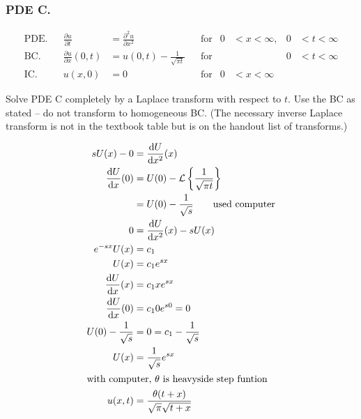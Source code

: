 \documentclass{article}
\begin{document}
\subsubsection*{PDE C.}
\begin{align*}
  \text{PDE.}&&\frac{\partial u}{\partial t}&=\frac{\partial^2u}{\partial x^2}&&\text{for}&0&<x<\infty,&0&<t<\infty\\
  \text{BC.}&&\frac{\partial u}{\partial x}(0,t)&=u(0,t)-\frac{1}{\sqrt{\pi t}}&&\text{for}&&&0&<t<\infty\\
  \text{IC.}&&u(x,0)&=0&&\text{for}&0&<x<\infty
\end{align*}

Solve PDE C completely by a Laplace transform with respect to $t$. Use the BC as stated -- do not transform to homogeneous BC. (The necessary inverse Laplace transform is not in the textbook table but is on the handout list of transforms.)

\begin{align*}
  sU(x)-0&=\frac{\mathrm{d}U}{\mathrm{d}x^2}(x)\\
  \frac{\mathrm{d}U}{\mathrm{d}x}(0)&=U(0)-\mathcal{L}\left\{\frac{1}{\sqrt{\pi t}}\right\}\\
  &=U(0)-\frac{1}{\sqrt{s}}\qquad\text{used computer}\\
  0&=\frac{\mathrm{d}U}{\mathrm{d}x^2}(x)-sU(x)\\
  e^{-sx}U(x)&=c_1\\
  U(x)&=c_1e^{sx}\\
  \frac{\mathrm{d}U}{\mathrm{d}x}(x)&=c_1xe^{sx}\\
  \frac{\mathrm{d}U}{\mathrm{d}x}(0)&=c_10e^{s0}=0\\
  U(0)-\frac{1}{\sqrt{s}}&=0=c_1-\frac{1}{\sqrt{s}}\\
  U(x)&=\frac{1}{\sqrt{s}}e^{sx}\\
  \intertext{with computer, $\theta$ is heavyside step funtion}
  u(x,t)&=\frac{\theta(t+x)}{\sqrt{\pi}\sqrt{t+x}}
\end{align*}
\end{document}
